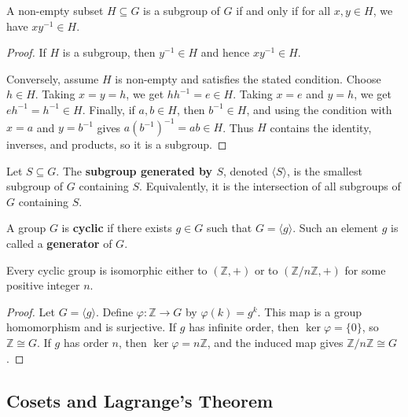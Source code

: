 \begin{lemma}
A non-empty subset $H\subseteq G$ is a subgroup of $G$ if and only if for all $x,y\in H$, we have $xy^{-1}\in H$.
\end{lemma}

\begin{proof}
If $H$ is a subgroup, then $y^{-1}\in H$ and hence $xy^{-1}\in H$.

Conversely, assume $H$ is non-empty and satisfies the stated condition. Choose $h\in H$. Taking $x=y=h$, we get $hh^{-1}=e\in H$. Taking $x=e$ and $y=h$, we get $eh^{-1}=h^{-1}\in H$. Finally, if $a,b\in H$, then $b^{-1}\in H$, and using the condition with $x=a$ and $y=b^{-1}$ gives $a(b^{-1})^{-1}=ab\in H$. Thus $H$ contains the identity, inverses, and products, so it is a subgroup.
\end{proof}

\begin{definition}
Let $S\subseteq G$. The \textbf{subgroup generated by $S$}, denoted $\langle S\rangle$, is the smallest subgroup of $G$ containing $S$. Equivalently, it is the intersection of all subgroups of $G$ containing $S$.
\end{definition}

\begin{definition}
A group $G$ is \textbf{cyclic} if there exists $g\in G$ such that $G=\langle g\rangle$. Such an element $g$ is called a \textbf{generator} of $G$.
\end{definition}

\begin{theorem}
Every cyclic group is isomorphic either to $(\mathbb{Z},+)$ or to $(\mathbb{Z}/n\mathbb{Z},+)$ for some positive integer $n$.
\end{theorem}

\begin{proof}
Let $G=\langle g\rangle$. Define $\varphi:\mathbb{Z}\to G$ by $\varphi(k)=g^k$. This map is a group homomorphism and is surjective. If $g$ has infinite order, then $\ker\varphi=\{0\}$, so $\mathbb{Z}\cong G$. If $g$ has order $n$, then $\ker\varphi=n\mathbb{Z}$, and the induced map gives $\mathbb{Z}/n\mathbb{Z}\cong G$.
\end{proof}

\subsection{Cosets and Lagrange's Theorem}


